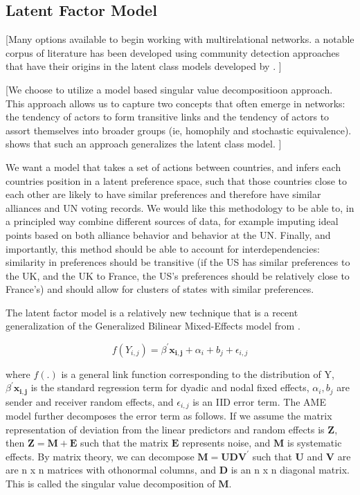 \subsection*{Latent Factor Model}

[Many options available to begin working with multirelational networks. a notable corpus of literature has been developed using community detection approaches that have their origins in the latent class models developed by \citet{nowicki:snijders:2001}. ]

[We choose to utilize a model based singular value decompositioon approach. This approach allows us to capture two concepts that often emerge in networks: the tendency of actors to form transitive links and the tendency of actors to assort themselves into broader groups (ie, homophily and stochastic equivalence). \citet{hoff:2007} shows that such an approach generalizes  the latent class model. ]

We want a model that takes a set of actions between countries, and infers each countries position in a latent preference space, such that those countries close to each other are likely to have similar preferences and therefore have similar alliances and UN voting records. We would like this methodology to be able to, in a principled way combine different sources of data, for example imputing ideal points based on both alliance behavior and behavior at the UN. Finally, and importantly, this method should be able to account for interdependencies: similarity in preferences should be transitive (if the US has similar preferences to the UK, and the UK to France, the US's preferences should be relatively close to France's) and should allow for clusters of states with similar preferences.

The latent factor model is a relatively new technique that is a recent generalization of the Generalized Bilinear Mixed-Effects model from \citet{hoff:2005}. 

\begin{equation}
	f(Y_{i,j}) =  \beta^{'}\mathbf{x_{i,j}} + \alpha_{i} + b_{j} + \epsilon_{i,j}
\end{equation}

where $f(.)$ is a general link function corresponding to the distribution of Y, $\beta^{'}\mathbf{x_{i,j}}$ is the standard regression term for dyadic and nodal fixed effects,  $\alpha_{i}, b_{j}$ are sender and receiver random effects, and $\epsilon_{i,j}$ is an IID error term. The AME model further decomposes the  error term as follows. If we assume the matrix representation of deviation from the linear predictors and random effects is $\mathbf{Z}$, then $\mathbf{Z} = \mathbf{M} + \mathbf{E}$ such that the matrix $\mathbf{E}$ represents noise, and $\mathbf{M}$ is systematic effects. By matrix theory, we can decompose $\mathbf{M} = \mathbf{UDV^{'}}$ such that $\mathbf{U}$ and $\mathbf{V}$ are are n x n matrices with othonormal columns, and $\mathbf{D}$ is an n x n diagonal matrix. This is called the singular value decomposition of $\mathbf{M}$. 


